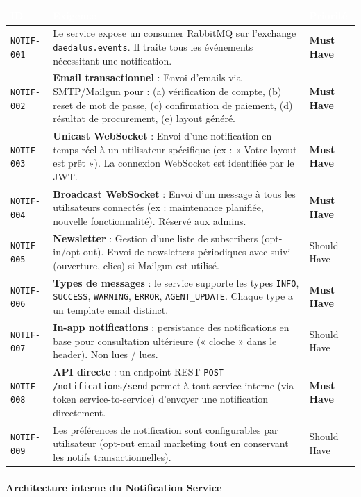 \documentclass[12pt,a4paper]{article}
\newcommand{\req}[1]{\texttt{\textcolor{daedalusblue}{#1}}}
\newcommand{\musthave}{\cellcolor{musthave}\textbf{Must Have}}
\newcommand{\shouldhave}{\cellcolor{shouldhave}Should Have}
\begin{document}
\begin{tabularx}{\textwidth}{|l|X|l|}
\hline
\rowcolor{tablehead}\textcolor{white}{\textbf{ID}} & \textcolor{white}{\textbf{Exigence}} & \textcolor{white}{\textbf{Priorité}} \\
\hline
\req{NOTIF-001} & Le service expose un consumer RabbitMQ sur l'exchange \texttt{daedalus.events}. Il traite tous les événements nécessitant une notification. & \musthave \\
\hline
\req{NOTIF-002} & \textbf{Email transactionnel} : Envoi d'emails via SMTP/Mailgun pour : (a) vérification de compte, (b) reset de mot de passe, (c) confirmation de paiement, (d) résultat de procurement, (e) layout généré. & \musthave \\
\hline
\req{NOTIF-003} & \textbf{Unicast WebSocket} : Envoi d'une notification en temps réel à un utilisateur spécifique (ex : « Votre layout est prêt »). La connexion WebSocket est identifiée par le JWT. & \musthave \\
\hline
\req{NOTIF-004} & \textbf{Broadcast WebSocket} : Envoi d'un message à tous les utilisateurs connectés (ex : maintenance planifiée, nouvelle fonctionnalité). Réservé aux admins. & \musthave \\
\hline
\req{NOTIF-005} & \textbf{Newsletter} : Gestion d'une liste de subscribers (opt-in/opt-out). Envoi de newsletters périodiques avec suivi (ouverture, clics) si Mailgun est utilisé. & \shouldhave \\
\hline
\req{NOTIF-006} & \textbf{Types de messages} : le service supporte les types \texttt{INFO}, \texttt{SUCCESS}, \texttt{WARNING}, \texttt{ERROR}, \texttt{AGENT\_UPDATE}. Chaque type a un template email distinct. & \musthave \\
\hline
\req{NOTIF-007} & \textbf{In-app notifications} : persistance des notifications en base pour consultation ultérieure (« cloche » dans le header). Non lues / lues. & \shouldhave \\
\hline
\req{NOTIF-008} & \textbf{API directe} : un endpoint REST \texttt{POST /notifications/send} permet à tout service interne (via token service-to-service) d'envoyer une notification directement. & \musthave \\
\hline
\req{NOTIF-009} & Les préférences de notification sont configurables par utilisateur (opt-out email marketing tout en conservant les notifs transactionnelles). & \shouldhave \\
\hline
\end{tabularx}

\paragraph{Architecture interne du Notification Service}
\end{document}
